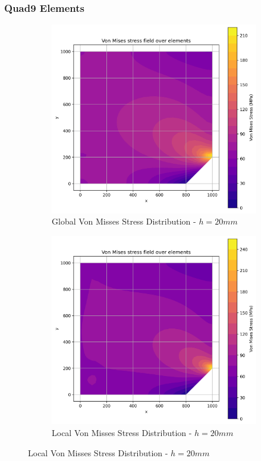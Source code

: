 \subsubsection{Quad9 Elements}

\begin{figure}[H]
  \centering
  \begin{subfigure}[b]{0.45\textwidth}
    \centering
    \includegraphics[width=\textwidth]{GRAFICOS/Quad9/2mm_global/resultados_von_mises.png}
    \caption{Global Von Misses Stress Distribution - $h=20mm$}
    \label{fig:img1}
  \end{subfigure}
  \hfill
  \begin{subfigure}[b]{0.45\textwidth}
    \centering
    \includegraphics[width=\textwidth]{GRAFICOS/Quad9/2mm_local/resultados_von_mises.png}
    \caption{Local Von Misses Stress Distribution - $h=20mm$}
    \label{fig:img2}
  \end{subfigure}
\end{figure}

